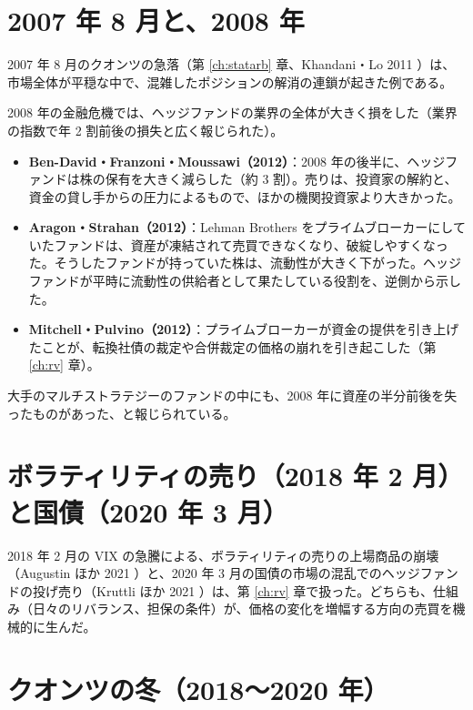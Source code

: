 \section{2007 年 8 月と、2008 年}

2007 年 8 月のクオンツの急落（第 \ref{ch:statarb} 章、Khandani・Lo 2011 \cite{khandanilo2011}）は、市場全体が平穏な中で、混雑したポジションの解消の連鎖が起きた例である。

2008 年の金融危機では、ヘッジファンドの業界の全体が大きく損をした（業界の指数で年 2 割前後の損失と広く報じられた）。

\begin{itemize}
\item \textbf{Ben-David・Franzoni・Moussawi（2012）}\cite{bfm2012}：2008 年の後半に、ヘッジファンドは株の保有を大きく減らした（約 3 割）。売りは、投資家の解約と、資金の貸し手からの圧力によるもので、ほかの機関投資家より大きかった。
\item \textbf{Aragon・Strahan（2012）}\cite{aragonstrahan2012}：Lehman Brothers をプライムブローカーにしていたファンドは、資産が凍結されて売買できなくなり、破綻しやすくなった。そうしたファンドが持っていた株は、流動性が大きく下がった。ヘッジファンドが平時に流動性の供給者として果たしている役割を、逆側から示した。
\item \textbf{Mitchell・Pulvino（2012）}\cite{mitchellpulvino2012}：プライムブローカーが資金の提供を引き上げたことが、転換社債の裁定や合併裁定の価格の崩れを引き起こした（第 \ref{ch:rv} 章）。
\end{itemize}

大手のマルチストラテジーのファンドの中にも、2008 年に資産の半分前後を失ったものがあった、と報じられている。

\section{ボラティリティの売り（2018 年 2 月）と国債（2020 年 3 月）}

2018 年 2 月の VIX の急騰による、ボラティリティの売りの上場商品の崩壊（Augustin ほか 2021 \cite{volmageddon2021}）と、2020 年 3 月の国債の市場の混乱でのヘッジファンドの投げ売り（Kruttli ほか 2021 \cite{kruttli2021}）は、第 \ref{ch:rv} 章で扱った。どちらも、仕組み（日々のリバランス、担保の条件）が、価格の変化を増幅する方向の売買を機械的に生んだ。

\section{クオンツの冬（2018〜2020 年）}

